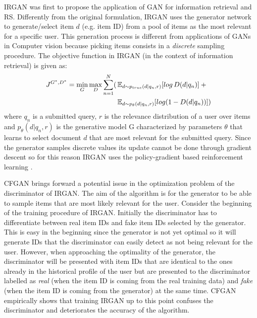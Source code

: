 IRGAN \cite{wang2017irgan} was first to propose the application of GAN for information retrieval and RS. Differently from the original formulation, IRGAN uses the generator network to generate/select item $d$ (e.g. item ID) from a pool of items as the most relevant for a specific user. This generation process is different from applications of GANs in Computer vision because picking items consists in a \emph{discrete} sampling procedure. The objective function in IRGAN (in the context of information retrieval) is given as:
\[
    \begin{split}
        J^{G^*,D^*} = \min_{G} \max_{D} \sum_{n=1}^N(
        & \operatorname{\mathbb{E}}_{d \sim{p_{true}(d|q_{n},r)}}[log \, D(d|q_{n})] \: + \: \\
        & \operatorname{\mathbb{E}}_{d \sim p_{\theta}(d|q_{n},r)}[log(1-D(d|q_{n}))])
    \end{split}
\]
where $q_{n}$ is a submitted query, $r$ is the relevance distribution of a user over items and $p_{\theta}(d|q_{n},r)$ is the generative model G characterized by parameters $\theta$ that learns to select document $d$ that are most relevant for the submitted query. Since the generator samples discrete values its update cannot be done through gradient descent so for this reason IRGAN uses the policy-gradient based reinforcement learning \cite{williams1992simple}.

CFGAN \cite{chae2018cfgan} brings forward a potential issue in the optimization problem of the discriminator of IRGAN. The aim of the algorithm is for the generator to be able to sample items that are most likely relevant for the user. Consider the beginning of the training procedure of IRGAN. Initially the discriminator has to differentiate between real item IDs and fake item IDs selected by the generator. This is easy in the beginning since the generator is not yet optimal so it will generate IDs that the discriminator can easily detect as not being relevant for the user. However, when approaching the optimality of the generator, the discriminator will be presented with item IDs that are identical to the ones already in the historical profile of the user but are presented to the discriminator labelled as \emph{real} (when the item ID is coming from the real training data) and \emph{fake} (when the item ID is coming from the generator) at the same time. CFGAN empirically shows that training IRGAN up to this point confuses the discriminator and deteriorates the accuracy of the algorithm.


